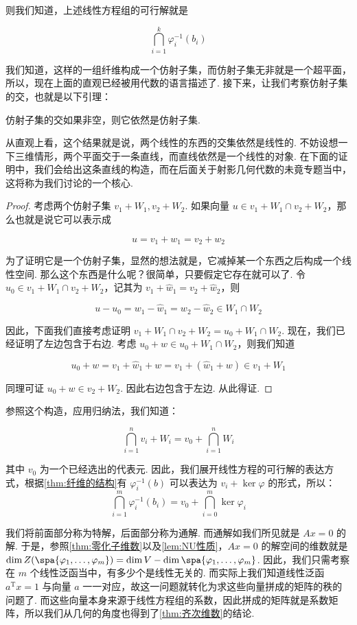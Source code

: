 则我们知道，上述线性方程组的可行解就是

\[
\bigcap_{i = 1}^k \varphi_i^{-1} (b_i)
\]

我们知道，这样的一组纤维构成一个仿射子集，而仿射子集无非就是一个超平面，所以，现在上面的直观已经被用代数的语言描述了. 接下来，让我们考察仿射子集的交，也就是以下引理：

\begin{lemma}{}{}
    仿射子集的交如果非空，则它依然是仿射子集.
\end{lemma}

从直观上看，这个结果就是说，两个线性的东西的交集依然是线性的. 不妨设想一下三维情形，两个平面交于一条直线，而直线依然是一个线性的对象. 在下面的证明中，我们会给出这条直线的构造，而在后面关于射影几何代数的未竟专题当中，这将称为我们讨论的一个核心.

\begin{proof}
    考虑两个仿射子集 $v_1 + W_1, v_2 + W_2$. 如果向量 $u \in v_1 + W_1 \cap v_2 + W_2$，那么也就是说它可以表示成

    \[
    u = v_1 + w_1 = v_2 + w_2
    \]

    为了证明它是一个仿射子集，显然的想法就是，它减掉某一个东西之后构成一个线性空间. 那么这个东西是什么呢？很简单，只要假定它存在就可以了. 令 $u_0 \in v_1 + W_1 \cap v_2 + W_2$，记其为 $v_1 + \hat w_1 = v_2 + \hat w_2$，则

    \[
    u - u_0 = w_1 - \hat w_1 = w_2 - \hat w_2 \in W_1 \cap W_2
    \]

    因此，下面我们直接考虑证明 $v_1 + W_1 \cap v_2 + W_2 = u_0 + W_1 \cap W_2$. 现在，我们已经证明了左边包含于右边. 考虑 $u_0 + w \in u_0 + W_1 \cap W_2$，则我们知道

    \[
    u_0 + w = v_1 + \hat w_1 + w = v_1 + (\hat w_1 + w) \in v_1 + W_1
    \]

    同理可证 $u_0 + w \in v_2 + W_2$. 因此右边包含于左边. 从此得证.
\end{proof}

参照这个构造，应用归纳法，我们知道：

\[
\bigcap_{i = 1}^n v_i + W_i = v_0 + \bigcap_{i = 1}^n W_i
\]

其中 $v_0$ 为一个已经选出的代表元. 因此，我们展开线性方程的可行解的表达方式，根据\autoref{thm:纤维的结构}有 $\varphi_i^{-1}(b)$ 可以表达为 $v_i + \ker \varphi$ 的形式，所以：
\[
\bigcap_{i = 1}^m \varphi_i^{-1} (b_i) = v_0 + \bigcap_{i = 0}^m \ker \varphi_i
\]

我们将前面部分称为特解，后面部分称为通解. 而通解如我们所见就是 $Ax = 0$ 的解. 于是，参照\autoref{thm:零化子维数}以及\autoref{lem:NU性质}，$Ax = 0$ 的解空间的维数就是 $\dim Z(\spa\{\varphi_1,\ldots,\varphi_m\}) = \dim V - \dim\spa\{\varphi_1,\ldots,\varphi_m\}$. 因此，我们只需考察在 $m$ 个线性泛函当中，有多少个是线性无关的. 而实际上我们知道线性泛函 $a^\mathrm{T}x = 1$ 与向量 $a$ 一一对应，故这一问题就转化为求这些向量拼成的矩阵的秩的问题了. 而这些向量本身来源于线性方程组的系数，因此拼成的矩阵就是系数矩阵，所以我们从几何的角度也得到了\autoref{thm:齐次维数}的结论.

